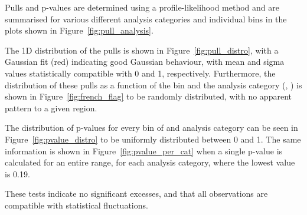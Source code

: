 
Pulls and p-values are determined using a profile-likelihood method and are
summarised for various different analysis categories and individual \HT bins
in the plots shown in Figure~\ref{fig:pull_analysis}.

The 1D distribution of the
pulls is shown in Figure~\ref{fig:pull_distro}, with a Gaussian fit (red)
indicating good Gaussian behaviour, with mean and sigma values statistically
compatible with 0 and 1, respectively. Furthermore, the distribution of
these pulls as a function of the \HT bin and
the analysis category (\nb, \nj) is shown in Figure~\ref{fig:french_flag} to be
randomly distributed, with no apparent pattern to a given region.

The distribution of p-values for every bin of \HT and analysis category can be
seen in Figure~\ref{fig:pvalue_distro} to be uniformly distributed between 0
and 1. The same information is shown in Figure~\ref{fig:pvalue_per_cat} when a
single p-value is calculated for an entire \HT range, for each analysis
category, where the lowest value is 0.19.

These tests indicate no significant excesses, and that all observations are
compatible with statistical fluctuations.




